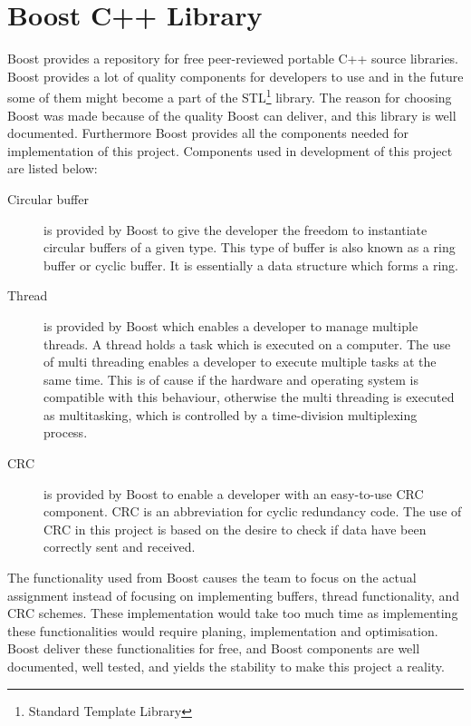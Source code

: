 \chapter{Boost C++ Library}\label{app:boost}
Boost provides a repository for free peer-reviewed portable C++ source libraries. Boost provides a lot of quality components for developers to use and in the future some of them might become a part of the STL\footnote{Standard Template Library} library. The reason for choosing Boost was made because of the quality Boost can deliver, and this library is well documented. Furthermore Boost provides all the components needed for implementation of this project. Components used in development of this project are listed below:

\begin{description}
\item[Circular buffer]
is provided by Boost to give the developer the freedom to instantiate circular buffers of a given type. This type of buffer is also known as a ring buffer or cyclic buffer. It is essentially a data structure which forms a ring. 

\item[Thread]
is provided by Boost which enables a developer to manage multiple threads. A thread holds a task which is executed on a computer. The use of multi threading enables a developer to execute multiple tasks at the same time. This is of cause if the hardware and operating system is compatible with this behaviour, otherwise the multi threading is executed as multitasking, which is controlled by a time-division multiplexing process.

\item[CRC]
is provided by Boost to enable a developer with an easy-to-use CRC component. CRC is an abbreviation for cyclic redundancy code. The use of CRC in this project is based on the desire to check if data have been correctly sent and received.
\end{description}

The functionality used from Boost causes the team to focus on the actual assignment instead of focusing on implementing buffers, thread functionality, and CRC schemes. These implementation would take too much time as implementing these functionalities would require planing, implementation and optimisation. Boost deliver these functionalities for free, and Boost components are well documented, well tested, and yields the stability to make this project a reality.